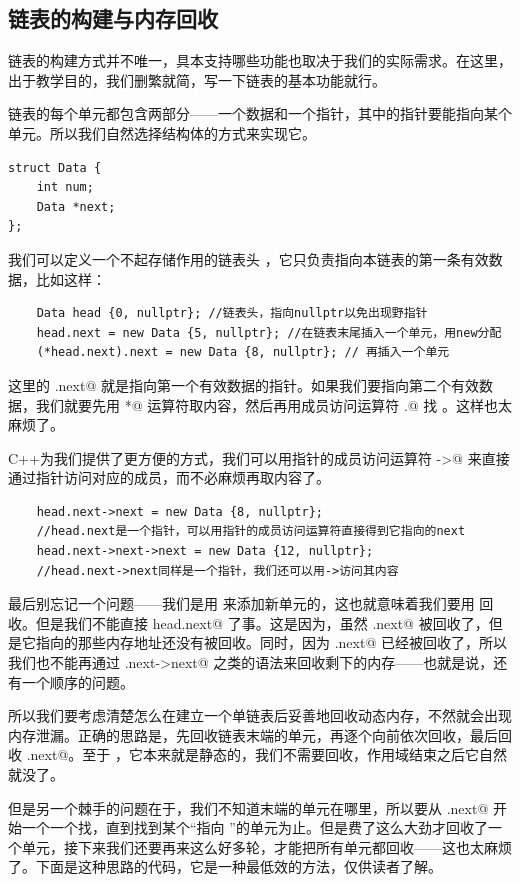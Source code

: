 \subsection*{链表的构建与内存回收}
链表的构建方式并不唯一，具本支持哪些功能也取决于我们的实际需求。在这里，出于教学目的，我们删繁就简，写一下链表的基本功能就行。\par
链表的每个单元都包含两部分——一个数据和一个指针，其中的指针要能指向某个单元。所以我们自然选择结构体的方式来实现它。
\begin{lstlisting}
struct Data {
    int num;
    Data *next;
};
\end{lstlisting}
我们可以定义一个不起存储作用的链表头 \lstinline@head@，它只负责指向本链表的第一条有效数据，比如这样：
\begin{lstlisting}
    Data head {0, nullptr}; //链表头，指向nullptr以免出现野指针
    head.next = new Data {5, nullptr}; //在链表末尾插入一个单元，用new分配
    (*head.next).next = new Data {8, nullptr}; // 再插入一个单元
\end{lstlisting}
这里的 \lstinline@head.next@ 就是指向第一个有效数据的指针。如果我们要指向第二个有效数据，我们就要先用 \lstinline@*@ 运算符取内容，然后再用成员访问运算符 \lstinline@.@ 找 \lstinline@next@。这样也太麻烦了。\par
C++为我们提供了更方便的方式，我们可以用指针的成员访问运算符 \lstinline@->@ 来直接通过指针访问对应的成员，而不必麻烦再取内容了。
\begin{lstlisting}
    head.next->next = new Data {8, nullptr};
    //head.next是一个指针，可以用指针的成员访问运算符直接得到它指向的next
    head.next->next->next = new Data {12, nullptr};
    //head.next->next同样是一个指针，我们还可以用->访问其内容
\end{lstlisting}\par
最后别忘记一个问题——我们是用 \lstinline@new@ 来添加新单元的，这也就意味着我们要用 \lstinline@delete@ 回收。但是我们不能直接 \lstinline@delete head.next@ 了事。这是因为，虽然 \lstinline@head.next@ 被回收了，但是它指向的那些内存地址还没有被回收。同时，因为 \lstinline@head.next@ 已经被回收了，所以我们也不能再通过 \lstinline@head.next->next@ 之类的语法来回收剩下的内存——也就是说，还有一个顺序的问题。\par
所以我们要考虑清楚怎么在建立一个单链表后妥善地回收动态内存，不然就会出现内存泄漏。正确的思路是，先回收链表末端的单元，再逐个向前依次回收，最后回收 \lstinline@head.next@。至于 \lstinline@head@，它本来就是静态的，我们不需要回收，作用域结束之后它自然就没了。\par
但是另一个棘手的问题在于，我们不知道末端的单元在哪里，所以要从 \lstinline@head.next@ 开始一个一个找，直到找到某个``\lstinline@next@ 指向 \lstinline@nullptr@''的单元为止。但是费了这么大劲才回收了一个单元，接下来我们还要再来这么好多轮，才能把所有单元都回收——这也太麻烦了。下面是这种思路的代码，它是一种最低效的方法，仅供读者了解。
